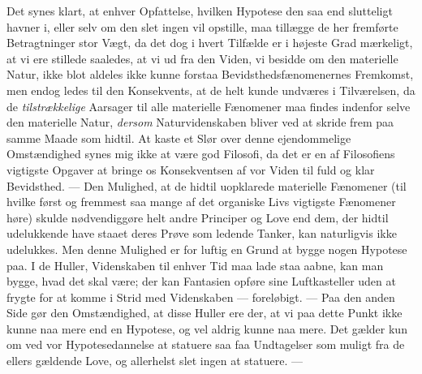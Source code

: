 \documentclass[12pt,a4paper,openany]{book}
\begin{document}
Det synes klart, at enhver Opfattelse, hvilken Hypotese den saa end slutteligt
havner i, eller selv om den slet ingen vil opstille, maa tillægge de her
fremførte Betragtninger stor Vægt, da det dog i hvert Tilfælde er i højeste
Grad mærkeligt, at vi ere stillede saaledes, at vi ud fra den Viden, vi besidde
om den materielle Natur, ikke blot aldeles ikke kunne forstaa
Bevidsthedsfænomenernes Fremkomst, men endog ledes til den Konsekvents, at de
helt kunde undværes i Tilværelsen, da de \emph{tilstrækkelige} Aarsager til
alle materielle Fænomener maa findes indenfor selve den materielle Natur,
\emph{dersom} Naturvidenskaben bliver ved at skride frem paa samme Maade som
hidtil. At kaste et Slør over denne ejendommelige Omstændighed synes mig ikke
at være god Filosofi, da det er en af Filosofiens vigtigste Opgaver at bringe
os Konsekventsen af vor Viden til fuld og klar Bevidsthed. --- Den Mulighed, at
de hidtil uopklarede materielle Fænomener (til hvilke først og fremmest saa
mange af det organiske Livs vigtigste Fænomener høre) skulde nødvendiggøre helt
andre Principer og Love end dem, der hidtil udelukkende have staaet deres Prøve
som ledende Tanker, kan naturligvis ikke udelukkes. Men denne Mulighed er for
luftig en Grund at bygge nogen Hypotese paa. I de Huller, Videnskaben til
enhver Tid maa lade staa aabne, kan man bygge, hvad det skal være; der kan
Fantasien opføre sine Luftkasteller uden at frygte for at komme i Strid med
Videnskaben --- foreløbigt. --- Paa den anden Side gør den Omstændighed, at
disse Huller ere der, at vi paa dette Punkt ikke kunne naa mere end en
Hypotese, og vel aldrig kunne naa mere. Det gælder kun om ved vor
Hypotesedannelse at statuere saa faa Undtagelser som muligt fra de ellers
gældende Love, og allerhelst slet ingen at statuere. ---
\end{document}
